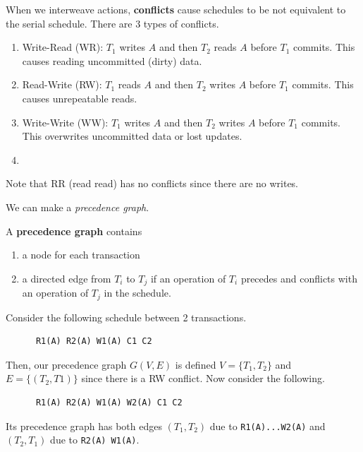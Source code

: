   \begin{definition}[Conflict]
    When we interweave actions, \textbf{conflicts} cause schedules to be not equivalent to the serial schedule. There are 3 types of conflicts. 
    \begin{enumerate}
      \item Write-Read (WR): $T_1$ writes $A$ and then $T_2$ reads $A$ before $T_1$ commits. This causes reading uncommitted (dirty) data. 
      \item Read-Write (RW): $T_1$ reads $A$ and then $T_2$ writes $A$ before $T_1$ commits. This causes unrepeatable reads. 
      \item Write-Write (WW): $T_1$ writes $A$ and then $T_2$ writes $A$ before $T_1$ commits. This overwrites uncommitted data or lost updates. 
      \item 
    \end{enumerate}
    Note that RR (read read) has no conflicts since there are no writes. 
  \end{definition}

  We can make a \textit{precedence graph}. 

  \begin{definition}
    A \textbf{precedence graph} contains 
    \begin{enumerate}
      \item a node for each transaction 
      \item a directed edge from $T_i$ to $T_j$ if an operation of $T_i$ precedes and conflicts with an operation of $T_j$ in the schedule. 
    \end{enumerate}
  \end{definition} 

  \begin{example}
    Consider the following schedule between 2 transactions. 
    \begin{lstlisting}
      R1(A) R2(A) W1(A) C1 C2
    \end{lstlisting}
    Then, our precedence graph $G(V, E)$ is defined $V = \{T_1, T_2\}$ and $E = \{(T_2, T1)\}$ since there is a RW conflict. Now consider the following. 
    \begin{lstlisting}
      R1(A) R2(A) W1(A) W2(A) C1 C2
    \end{lstlisting}
    Its precedence graph has both edges $(T_1, T_2)$ due to \texttt{R1(A)...W2(A)} and $(T_2, T_1)$ due to \texttt{R2(A) W1(A)}. 
  \end{example}

